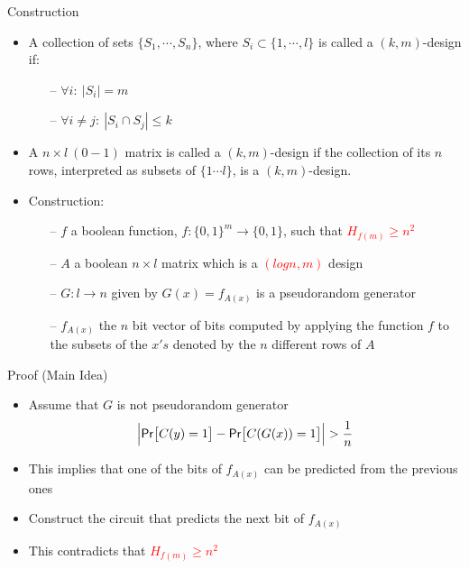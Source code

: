 \documentclass[xcolor={table,dvipsnames,usenames}]{beamer}
\begin{document}
\begin{frame}{Construction}
\begin{itemize}
	\pause
	\item A collection of sets $\{S_1, \cdots, S_n\}$, where $S_i \subset \{1, \cdots ,l\}$ is called a $(k,m)$-design if:
	\begin{itemize}
		\item[--] $\forall i:~|S_i| = m$
		\item[--] $\forall i \neq j:~|S_i \cap S_j| \leq k$
	\end{itemize}
	\pause
	\item A $n \times l~(0-1)$ matrix is called a $(k,m)$-design if the collection of its $n$ rows, interpreted as subsets of $\{1 \cdots l\}$, is a $(k,m)$-design.
	\pause
	\item Construction:
	\pause
	\begin{itemize}
		\item[--] $f$ a boolean function, $f:\{0, 1\}^m \rightarrow \{0, 1\}$, such that \textcolor{red}{$H_{f(m)} \ge n^2$}
		\pause
		\item[--] $A$ a boolean $n \times l$ matrix which is a \textcolor{red}{$(logn,m)$} design
		\pause
		\item[--] $G:l \rightarrow n$ given by $G(x) = f_{A(x)}$ is a pseudorandom generator
		\pause
		\item[--] $f_{A(x)}$ the $n$ bit vector of bits computed by applying the function $f$ to the subsets of the $x's$ denoted by the $n$ different rows of $A$
	\end{itemize}
\end{itemize}
\end{frame}
\begin{frame}{Proof (Main Idea)}
\begin{itemize}
	\item Assume that $G$ is not pseudorandom generator
	$$ \Big|\mathsf{Pr}\big[C(y)=1\big] - \mathsf{Pr}\big[C(G (x))=1\big]\Big| > \frac{1}{n}$$
	\pause
	\item This implies that one of the bits of $f_{A(x)}$ can be predicted from the previous ones
	\pause 
	\item Construct the circuit that predicts the next bit of $f_{A(x)}$
	\pause
	\item This contradicts that  \textcolor{red}{$H_{f(m)} \ge n^2$}
\end{itemize}
\end{frame}
\end{document}
